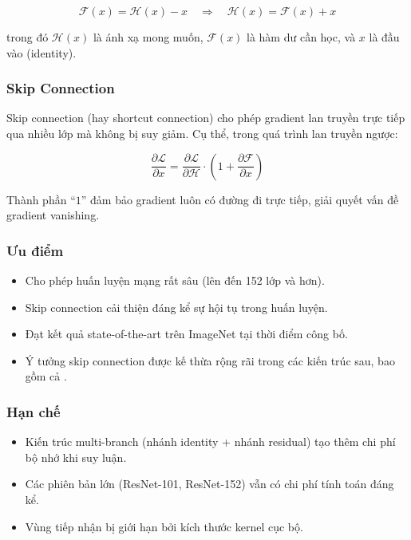 \begin{equation}
    \mathcal{F}(x) = \mathcal{H}(x) - x \quad \Rightarrow \quad \mathcal{H}(x) = \mathcal{F}(x) + x
    \label{eq:residual}
\end{equation}

\noindent trong đó $\mathcal{H}(x)$ là ánh xạ mong muốn, $\mathcal{F}(x)$ là hàm dư cần học, và $x$ là đầu vào (identity).

\subsubsection*{Skip Connection}

Skip connection (hay shortcut connection) cho phép gradient lan truyền trực tiếp qua nhiều lớp mà không bị suy giảm. Cụ thể, trong quá trình lan truyền ngược:

\begin{equation}
    \frac{\partial \mathcal{L}}{\partial x} = \frac{\partial \mathcal{L}}{\partial \mathcal{H}} \cdot \left(1 + \frac{\partial \mathcal{F}}{\partial x}\right)
\end{equation}

Thành phần ``$1$'' đảm bảo gradient luôn có đường đi trực tiếp, giải quyết vấn đề gradient vanishing.

\subsubsection*{Ưu điểm}
\begin{itemize}
    \item Cho phép huấn luyện mạng rất sâu (lên đến 152 lớp và hơn).
    \item Skip connection cải thiện đáng kể sự hội tụ trong huấn luyện.
    \item Đạt kết quả state-of-the-art trên ImageNet tại thời điểm công bố.
    \item Ý tưởng skip connection được kế thừa rộng rãi trong các kiến trúc sau, bao gồm cả \fastvit{}.
\end{itemize}

\subsubsection*{Hạn chế}
\begin{itemize}
    \item Kiến trúc multi-branch (nhánh identity + nhánh residual) tạo thêm chi phí bộ nhớ khi suy luận.
    \item Các phiên bản lớn (ResNet-101, ResNet-152) vẫn có chi phí tính toán đáng kể.
    \item Vùng tiếp nhận bị giới hạn bởi kích thước kernel cục bộ.
\end{itemize}


